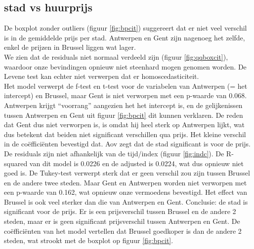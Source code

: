 \documentclass[a4paper,kulak]{kulakarticle} %
\begin{document}
\subsection{stad vs huurprijs}
\label{sec:stadvsprijs}
De boxplot zonder outliers (figuur \ref{fig:bpcit}) suggereert  dat er niet veel verschil is in de gemiddelde prijs per stad. Antwerpen en Gent zijn nagenoeg het zelfde, enkel de prijzen in Brussel liggen wat lager. \\
We zien dat de residuals niet normaal verdeeld zijn (figuur \ref{fig:qqboxcit}), waardoor onze bevindingen opnieuw niet steenhard mogen genomen worden. De Levene test kan echter niet verwerpen dat er homoscedasticiteit.\\
Het model verwerpt de f-test en t-test voor de variabelen van Antwerpen (= het intercept) en Brussel, maar Gent is niet verworpen  met een p-waarde van 0.068. 
Antwerpen krijgt ``voorrang'' aangezien het het intercept is, en de gelijkenissen tussen Antwerpen en Gent uit figuur \ref*{fig:bpcit} dit kunnen verklaren. 
De reden dat Gent dus niet verworpen is, is omdat hij heel sterk op Antwerpen lijkt, wat dus betekent dat beiden niet significant verschillen qua prijs.
Het kleine verschil in de coëfficiënten bevestigd dat.
Aov zegt dat de stad significant is voor de prijs. 
De residuals zijn niet afhankelijk van de tijd/index (figuur \ref{fig:indc}).
De R-squared van dit model is 0.0226 en de adjusted is 0.0224, wat dus opnieuw niet goed is.
De Tukey-test verwerpt sterk dat er geen verschil zou zijn tussen Brussel en de andere twee steden. Maar Gent en Antwerpen worden niet verworpen  met een p-waarde van 0.162, wat opnieuw onze vermoedens bevestigd. 
Het effect van Brussel is ook veel sterker dan die van Antwerpen en Gent. 
Conclusie: de stad is significant voor de prijs. Er is een prijsverschil tussen Brussel en de andere 2 steden, maar er is geen significant prijsverschil tussen Antwerpen en Gent.
De coëfficiënten van het model vertellen dat Brussel goedkoper is dan de andere 2 steden, wat strookt met de boxplot op figuur \ref{fig:bpcit}.
\end{document}
